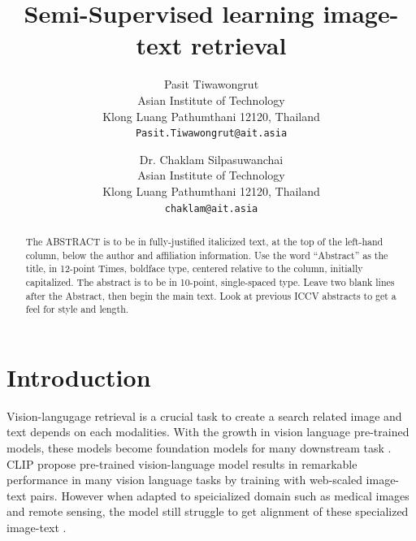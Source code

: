 \documentclass[10pt,twocolumn,letterpaper]{article}
\begin{document}
\title{Semi-Supervised learning image-text retrieval}

\author{Pasit Tiwawongrut\\
Asian Institute of Technology\\
Klong Luang Pathumthani 12120, Thailand\\
{\tt\small Pasit.Tiwawongrut@ait.asia}
\and
Dr. Chaklam Silpasuwanchai\\
Asian Institute of Technology\\
Klong Luang Pathumthani 12120, Thailand\\
{\tt\small chaklam@ait.asia}
}

\maketitle
\ificcvfinal\thispagestyle{empty}\fi

\begin{abstract}
   The ABSTRACT is to be in fully-justified italicized text, at the top
   of the left-hand column, below the author and affiliation
   information. Use the word ``Abstract'' as the title, in 12-point
   Times, boldface type, centered relative to the column, initially
   capitalized. The abstract is to be in 10-point, single-spaced type.
   Leave two blank lines after the Abstract, then begin the main text.
   Look at previous ICCV abstracts to get a feel for style and length.
\end{abstract}

\section{Introduction}

Vision-langugage retrieval is a crucial task to create a search related image and text depends on each modalities.
With the growth in vision language pre-trained models, these models become foundation models for many downstream task \cite{foundation_model}.
CLIP \cite{clip} propose pre-trained vision-language model results in remarkable performance in many vision language tasks by training with web-scaled image-text pairs.
However when adapted to speicialized domain such as medical images and remote sensing, the model still struggle to get alignment of these specialized image-text \cite{s-clip}.
\end{document}
